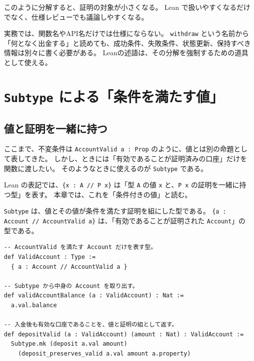このように分解すると、証明の対象が小さくなる。
Lean で扱いやすくなるだけでなく、仕様レビューでも議論しやすくなる。

\begin{softwarebox}
実務では、関数名やAPI名だけでは仕様にならない。
\texttt{withdraw} という名前から「何となく出金する」と読めても、成功条件、失敗条件、状態更新、保持すべき情報は別々に書く必要がある。
Leanの述語は、その分解を強制するための道具として使える。
\end{softwarebox}

\section{\texttt{Subtype} による「条件を満たす値」}

\subsection{値と証明を一緒に持つ}

ここまで、不変条件は \texttt{AccountValid a : Prop} のように、値とは別の命題として表してきた。
しかし、ときには「有効であることが証明済みの口座」だけを関数に渡したい。
そのようなときに使えるのが \texttt{Subtype} である。

Lean の表記では、\texttt{\{x : A // P x\}} は「型 \texttt{A} の値 \texttt{x} と、\texttt{P x} の証明を一緒に持つ型」を表す。
本章では、これを「条件付きの値」と読む。

\begin{definitionbox}
\texttt{Subtype} は、値とその値が条件を満たす証明を組にした型である。
\texttt{\{a : Account // AccountValid a\}} は、「有効であることが証明された \texttt{Account}」の型である。
\end{definitionbox}

\begin{listing}[htbp]
\begin{verbatim}
-- AccountValid を満たす Account だけを表す型。
def ValidAccount : Type :=
  { a : Account // AccountValid a }

-- Subtype から中身の Account を取り出す。
def validAccountBalance (a : ValidAccount) : Nat :=
  a.val.balance

-- 入金後も有効な口座であることを、値と証明の組として返す。
def depositValid (a : ValidAccount) (amount : Nat) : ValidAccount :=
  Subtype.mk (deposit a.val amount)
    (deposit_preserves_valid a.val amount a.property)
\end{verbatim}
\caption{Subtypeで有効な口座だけを表す}
\label{lst:ch04_subtype}
\end{listing}

